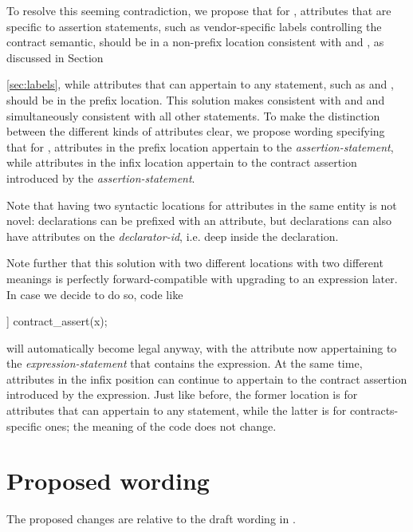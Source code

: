To resolve this seeming contradiction, we propose that for , attributes that are specific to assertion statements, such as vendor-specific labels controlling the contract semantic, should be in a non-prefix location consistent with  and , as discussed in Section {\ref{sec:labels}, while attributes that can appertain to any statement, such as \tcode{[[likely]]} and \tcode{[[unlikely]]}, should be in the prefix location. This solution makes  consistent with  and  and simultaneously consistent with all other statements. To make the distinction between the different kinds of attributes clear, we propose wording specifying that for , attributes in the prefix location appertain to the \emph{assertion-statement}, while attributes in the infix location appertain to the contract assertion introduced by the \emph{assertion-statement}.

Note that having two syntactic locations for attributes in the same entity is not novel: declarations can be prefixed with an attribute, but declarations can also have attributes on the \emph{declarator-id}, i.e. deep inside the declaration.

Note further that this solution with two different locations with two different meanings is perfectly forward-compatible with upgrading  to an expression later. In case we decide to do so, code like
\begin{codeblock}
[[likely]] contract_assert(x);
\end{codeblock}
will automatically become legal anyway, with the \tcode{[[likely]]} attribute now appertaining to the \emph{expression-statement} that contains the  expression. At the same time, attributes in the infix position can continue to appertain to the contract assertion introduced by the expression. Just like before, the former location is for attributes that can appertain to any statement, while the latter is for contracts-specific ones; the meaning of the code does not change.


\section{Proposed wording}

The proposed changes are relative to the draft wording in \cite{P2900R5}. 

}
